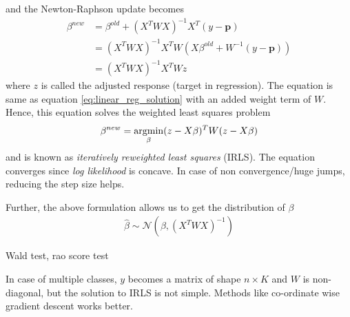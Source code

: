 \documentclass[../statistical_learning_notes.tex]{subfiles}
\begin{document}
    and the Newton-Raphson update becomes
    \begin{align*}
        \beta^{new} &= \beta^{old} + (X^{T}WX)^{-1} X^{T}(y - \mathbf{p})\\
        &= (X^{T}WX)^{-1} X^{T}W(X\beta^{old} + W^{-1}(y - \mathbf{p}))\\
        &= (X^{T}WX)^{-1} X^{T}Wz
    \end{align*}
    where $z$ is called the adjusted response (target in regression). The equation is same as equation \ref{eq:linear_reg_solution} with an added weight term of $W$. Hence, this equation solves the weighted least squares problem
    \begin{align*}
        \beta^{new} = \operatorname*{argmin}_{\beta} (z - X\beta)^{T}W(z - X\beta)
    \end{align*}
    and is known as \emph{iteratively reweighted least squares} (IRLS). The equation converges since \emph{log likelihood} is concave. In case of non convergence/huge jumps, reducing the step size helps.\newline

    Further, the above formulation allows us to get the distribution of $\beta$
    \begin{align*}
        \hat{\beta} \sim \mathcal{N}(\beta, (X^{T}WX)^{-1})
    \end{align*}

    Wald test, rao score test\newline

    In case of multiple classes, $y$ becomes a matrix of shape $n \times K$ and $W$ is non-diagonal, but the solution to IRLS is not simple. Methods like co-ordinate wise gradient descent works better.\newline


\end{document}
